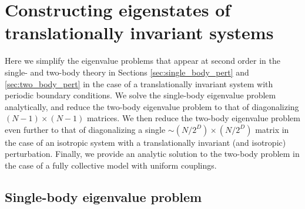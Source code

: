 \documentclass[nofootinbib,notitlepage,11pt]{revtex4-2}
\newcommand{\p}[1]{\left(#1\right)} %
\newcommand{\1}{\mathds{1}}
\begin{document}
\vspace{1cm}

\section{Constructing eigenstates of translationally invariant
  systems}
\label{sec:trans_inv}

Here we simplify the eigenvalue problems that appear at second order
in the single- and two-body theory in Sections
\ref{sec:single_body_pert} and \ref{sec:two_body_pert} in the case of
a translationally invariant system with periodic boundary conditions.
We solve the single-body eigenvalue problem analytically, and reduce
the two-body eigenvalue problem to that of diagonalizing
$\p{N-1}\times\p{N-1}$ matrices.  We then reduce the two-body
eigenvalue problem even further to that of diagonalizing a single
$\sim\p{N/2^D}\times\p{N/2^D}$ matrix in the case of an isotropic
system with a translationally invariant (and isotropic) perturbation.
Finally, we provide an analytic solution to the two-body problem in
the case of a fully collective model with uniform couplings.

\subsection{Single-body eigenvalue problem}
\label{sec:trans_inv_single}
\end{document}
